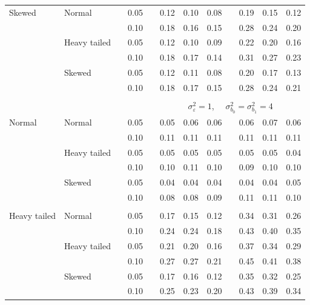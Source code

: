 \documentclass[12pt]{article} %
\begin{document}
\begin{table}[ht]
\begin{scriptsize}
\begin{center}
\begin{tabular}{ll p{.1cm} c p{.1cm} rrr p{.1cm} rrr}
Skewed       & Normal       && 0.05 &&  0.12 & 0.10 & 0.08 && 0.19 & 0.15 & 0.12 \\ 
             &              && 0.10 &&  0.18 & 0.16 & 0.15 && 0.28 & 0.24 & 0.20 \\ 
             & Heavy tailed && 0.05 &&  0.12 & 0.10 & 0.09 && 0.22 & 0.20 & 0.16 \\ 
             &              && 0.10 &&  0.18 & 0.17 & 0.14 && 0.31 & 0.27 & 0.23 \\ 
             & Skewed       && 0.05 &&  0.12 & 0.11 & 0.08 && 0.20 & 0.17 & 0.13 \\ 
             &              && 0.10 &&  0.18 & 0.17 & 0.15 && 0.28 & 0.24 & 0.21 \\ 


&&&&&&&&&&&\\
& && && \multicolumn{7}{c}{$\sigma_{\varepsilon}^2 = 1$, \ \ $\sigma_{b_0}^2 = \sigma_{b_1}^2 = 4$} \\ \cline{6-12}
\rowcolor{gray!20}Normal       & Normal       && 0.05 &&  0.05 & 0.06 & 0.06 && 0.06 & 0.07 & 0.06 \\ 
\rowcolor{gray!20}             &              && 0.10 &&  0.11 & 0.11 & 0.11 && 0.11 & 0.11 & 0.11 \\ 
\rowcolor{gray!20}             & Heavy tailed && 0.05 &&  0.05 & 0.05 & 0.05 && 0.05 & 0.05 & 0.04 \\ 
\rowcolor{gray!20}             &              && 0.10 &&  0.10 & 0.11 & 0.10 && 0.09 & 0.10 & 0.10 \\ 
\rowcolor{gray!20}             & Skewed       && 0.05 &&  0.04 & 0.04 & 0.04 && 0.04 & 0.04 & 0.05 \\ 
\rowcolor{gray!20}             &              && 0.10 &&  0.08 & 0.08 & 0.09 && 0.11 & 0.11 & 0.10 \\ 
             &&&&&&&&&&&\\
Heavy tailed & Normal       && 0.05 &&  0.17 & 0.15 & 0.12 && 0.34 & 0.31 & 0.26 \\ 
             &              && 0.10 &&  0.24 & 0.24 & 0.18 && 0.43 & 0.40 & 0.35 \\ 
             & Heavy tailed && 0.05 &&  0.21 & 0.20 & 0.16 && 0.37 & 0.34 & 0.29 \\ 
             &              && 0.10 &&  0.27 & 0.27 & 0.21 && 0.45 & 0.41 & 0.38 \\ 
             & Skewed       && 0.05 &&  0.17 & 0.16 & 0.12 && 0.35 & 0.32 & 0.25 \\ 
             &              && 0.10 &&  0.25 & 0.23 & 0.20 && 0.43 & 0.39 & 0.34 \\ 

\end{tabular}
\end{center}
\end{scriptsize}
\end{table}
\end{document}
